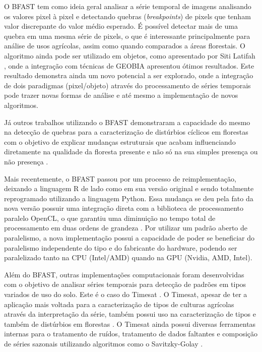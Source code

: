 O BFAST tem como ideia geral analisar a série temporal de imagens analisando os valores pixel à pixel e detectando quebras (\textit{breakpoints}) de pixels que tenham valor discrepante do valor médio esperado. É possível detectar mais de uma quebra em uma mesma série de pixels, o que é interessante principalmente para análise de usos agrícolas, assim como quando comparados a áreas florestais. O algoritmo ainda pode ser utilizado em objetos, como apresentado por Siti Latifah \citep{LATIFAH2016}, onde a integração com técnicas de GEOBIA apresentou ótimos resultados. Este resultado demonstra ainda um novo potencial a ser explorado, onde a integração de dois paradigmas (pixel/objeto) através do processamento de séries temporais pode trazer novas formas de análise e até mesmo a implementação de novos algoritmos.

Já outros trabalhos utilizando o BFAST demonstraram a capacidade do mesmo na detecção de quebras para a caracterização de distúrbios cíclicos em florestas com o objetivo de explicar mudanças estruturais que acabam influenciando diretamente na qualidade da floresta presente e não só na sua simples presença ou não presença \citep{JAKOVAC2017, DUTRIEUX2016112}.

Mais recentemente, o BFAST passou por um processo de reimplementação, deixando a linguagem R de lado como em sua versão original e sendo totalmente reprogramado utilizando a linguagem Python. Essa mudança se deu pela fato da nova versão possuir uma integração direta com a biblioteca de processamento paralelo OpenCL, o que garantiu uma diminuição no tempo total de processamento em duas ordens de grandeza \citep{Gieseke2020}. Por utilizar um padrão aberto de paralelismo, a nova implementação possui a capacidade de poder se beneficiar do paralelismo independente do tipo e do fabricante do hardware, podendo ser paralelizado tanto na CPU (Intel/AMD) quando na GPU (Nvidia, AMD, Intel).

Além do BFAST, outras implementações computacionais foram desenvolvidas com o objetivo de analisar séries temporais para detecção de padrões em tipos variados de uso do solo. Este é o caso do Timesat \citep{Jnsson2004TIMESATA}. O Timesat, apesar de ter a aplicação mais voltada para a caracterização de tipos de culturas agrícolas através da interpretação da série, também possui uso na caracterização de tipos e também de distúrbios em florestas \citep{Wenbo2017}. O Timesat ainda possui diversas ferramentas internas para o tratamento de ruídos, tratamento de dados faltantes e composição de séries sazonais utilizando algoritmos como o Savitzky-Golay \citep{Savitzky1964}.

